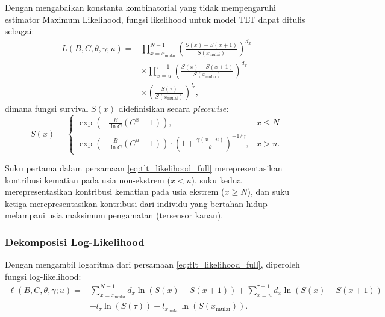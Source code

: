 Dengan mengabaikan konstanta kombinatorial yang tidak mempengaruhi estimator Maximum Likelihood, fungsi likelihood untuk model TLT dapat ditulis sebagai:
\begin{equation}
\begin{split}
L(B, C, \theta, \gamma; u) = &\prod_{x=x_{\text{mulai}}}^{N-1} \left(\frac{S(x) - S(x+1)}{S(x_{\text{mulai}})}\right)^{d_x} \\
&\times \prod_{x=u}^{\tau-1} \left(\frac{S(x) - S(x+1)}{S(x_{\text{mulai}})}\right)^{d_x} \\
&\times \left(\frac{S(\tau)}{S(x_{\text{mulai}})}\right)^{l_\tau},
\end{split}
\label{eq:tlt_likelihood_full}
\end{equation}
dimana fungsi survival $S(x)$ didefinisikan secara \textit{piecewise}:
\begin{equation}
S(x) = 
\begin{cases}
\exp\left(-\frac{B}{\ln C}(C^x - 1)\right), & x \leq N \\[10pt]
\exp\left(-\frac{B}{\ln C}(C^u - 1)\right) \cdot \left(1 + \frac{\gamma(x-u)}{\theta}\right)^{-1/\gamma}, & x > u.
\end{cases}
\label{eq:tlt_survival_piecewise}
\end{equation}

Suku pertama dalam persamaan \eqref{eq:tlt_likelihood_full} merepresentasikan kontribusi kematian pada usia non-ekstrem ($x < u$), suku kedua merepresentasikan kontribusi kematian pada usia ekstrem ($x \geq N$), dan suku ketiga merepresentasikan kontribusi dari individu yang bertahan hidup melampaui usia maksimum pengamatan (tersensor kanan).

\subsubsection{Dekomposisi Log-Likelihood}

Dengan mengambil logaritma dari persamaan \eqref{eq:tlt_likelihood_full}, diperoleh fungsi log-likelihood:
\begin{equation}
\begin{split}
\ell(B, C, \theta, \gamma; u) = &\sum_{x=x_{\text{mulai}}}^{N-1} d_x \ln(S(x) - S(x+1)) + \sum_{x=u}^{\tau-1} d_x \ln(S(x) - S(x+1)) \\
&+ l_\tau \ln(S(\tau)) - l_{x_{\text{mulai}}} \ln(S(x_{\text{mulai}})).
\end{split}
\label{eq:tlt_loglik_expanded}
\end{equation}

